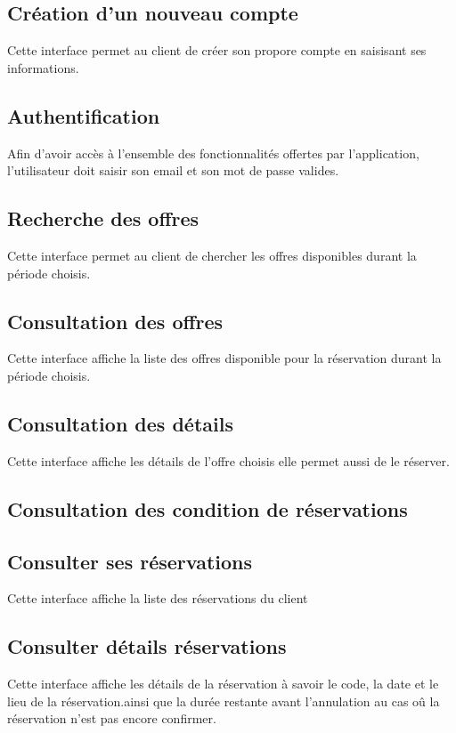 \documentclass[12pt,a4paper]{report}
\begin{document}
	\subsection{Création d'un nouveau compte}
Cette interface permet au client de créer son propore compte en saisisant ses informations.
	
	\subsection{Authentification}
Afin d’avoir accès à l’ensemble des fonctionnalités offertes par l’application, l’utilisateur doit
saisir son email et son mot de passe valides.
	
	\subsection{Recherche des offres}
Cette interface permet au client de chercher les offres disponibles durant la période choisis.

	\subsection{Consultation des offres}
Cette interface affiche la liste des offres disponible pour la réservation durant la période choisis.
	
	\subsection{Consultation des détails}
Cette interface affiche les détails de l'offre choisis elle permet aussi de le réserver.

	\subsection{Consultation des condition de réservations}
	
	\subsection{Consulter ses réservations}
Cette interface affiche la liste des réservations du client

	\subsection{Consulter détails réservations}
Cette interface affiche les détails de la réservation à savoir le code, la date et le lieu de la réservation.ainsi que la durée restante avant l'annulation au cas oû la réservation n'est pas encore confirmer.
	
\end{document}
